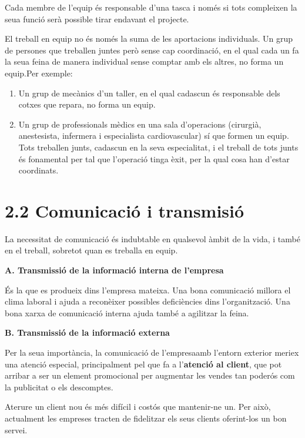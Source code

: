 \documentclass[
  a4paper,
  openany]{book}
\begin{document}
Cada membre de l'equip és responsable d'una tasca i només si tots compleixen la seua funció serà possible tirar endavant el projecte.

El treball en equip no és només la suma de les aportacions individuals. Un grup de persones que treballen juntes però sense cap coordinació, en el qual cada un fa la seua feina de manera individual sense comptar amb els altres, no forma un equip.Per exemple:

\begin{enumerate}
\def\labelenumi{\alph{enumi}.}
\item
  Un grup de mecànics d'un taller, en el qual cadascun és responsable dels cotxes que repara, no forma un equip.
\item
  Un grup de professionals mèdics en una sala d'operacions (cirurgià, anestesista, infermera i especialista cardiovascular) sí que formen un equip. Tots treballen junts, cadascun en la seva especialitat, i el treball de tots junts és fonamental per tal que l'operació tinga èxit, per la qual cosa han d'estar coordinats.
\end{enumerate}

\hypertarget{comunicaciuxf3-i-transmisiuxf3}{%
\section{2.2 Comunicació i transmisió}\label{comunicaciuxf3-i-transmisiuxf3}}

La necessitat de comunicació és indubtable en qualsevol àmbit de la vida, i també en el treball, sobretot quan es treballa en equip.

\textbf{A. Transmissió de la informació interna de l'empresa}

És la que es produeix dins l'empresa mateixa. Una bona comunicació millora el clima laboral i ajuda a reconèixer possibles deficiències dins l'organització. Una bona xarxa de comunicació interna ajuda també a agilitzar la feina.

\textbf{B. Transmissió de la informació externa}

Per la seua importància, la comunicació de l'empresaamb l'entorn exterior meriex una atenció especial, principalment pel que fa a l'\textbf{atenció al client}, que pot arribar a ser un element promocional per augmentar les vendes tan poderós com la publicitat o els descomptes.

Aterure un client nou és més difícil i costós que mantenir-ne un. Per això, actualment les empreses tracten de fidelitzar els seus clients oferint-los un bon servei.
\end{document}
